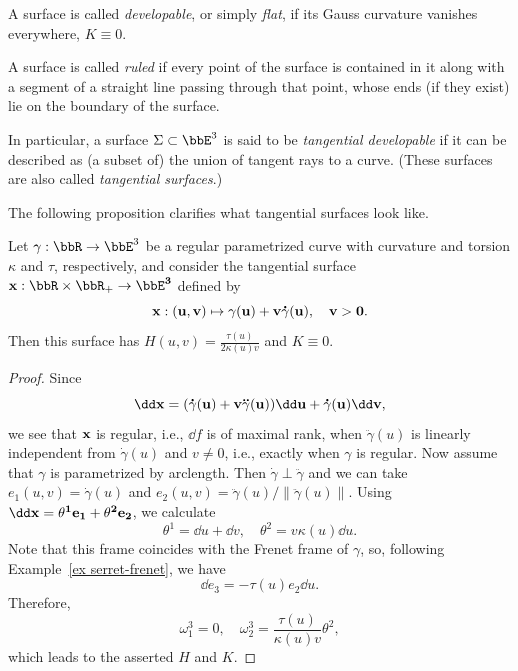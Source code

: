 \begin{defn}
    A surface is called \emph{developable}, or simply \emph{flat}, if its Gauss curvature vanishes everywhere, $K\equiv 0$.

    A surface is called \emph{ruled} if every point of the surface is contained in it along with a segment of a straight line passing through that point, whose ends (if they exist) lie on the boundary of the surface.

    In particular, a surface $\Sigma\subset\bbE^3$ is said to be \emph{tangential developable} if it can be described as (a subset of) the union of tangent rays to a curve. (These surfaces are also called \emph{tangential surfaces}.)
\end{defn}
The following proposition clarifies what tangential surfaces look like.
\begin{prop}
    Let $\gamma:\bbR\to \bbE^3$ be a regular parametrized curve with curvature and torsion $\kappa$ and $\tau$, respectively, and consider the tangential surface $\bf{x}:\bbR\times \bbR_+\to \bbE^3$ defined by 
    \[\bf{x}:(u,v)\mapsto \gamma(u)+v\dot\gamma(u),\quad v>0.\]
    Then this surface has $H(u,v)=\frac{\tau(u)}{2\kappa(u)v}$ and $K\equiv 0$.
\end{prop}
\begin{proof}
    Since 
    \[\dd \bf{x}=(\dot\gamma(u)+v\ddot\gamma(u))\dd u+\dot\gamma(u)\dd v,\]
    we see that $\bf{x}$ is regular, i.e., $\dd f$ is of maximal rank, when $\ddot \gamma(u)$ is linearly independent from $\dot\gamma(u)$ and $v\neq 0$, i.e., exactly when $\gamma$ is regular. Now assume that $\gamma$ is parametrized by arclength. Then $\dot\gamma\perp\ddot\gamma$ and we can take $e_1(u,v)=\dot\gamma(u)$ and $e_2(u,v)=\ddot\gamma(u)/\lVert\ddot\gamma(u)\rVert$. Using $\dd \bf{x}=\theta^1e_1+\theta^2e_2$, we calculate 
    \[\theta^1=\dd u+\dd v,\quad \theta^2=v\kappa(u)\dd u.\]
    Note that this frame coincides with the Frenet frame of $\gamma$, so, following Example~\ref{ex serret-frenet}, we have 
    \[\dd e_3=-\tau(u)e_2\dd u.\]
    Therefore, 
    \[\omega_1^3=0,\quad \omega_2^3=\frac{\tau(u)}{\kappa(u)v}\theta^2,\]
    which leads to the asserted $H$ and $K$.
\end{proof}

